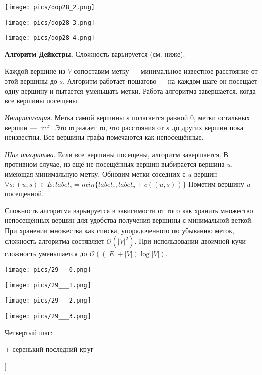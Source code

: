 \texttt{[image: pics/dop28\_2.png]}

\texttt{[image: pics/dop28\_3.png]}

\texttt{[image: pics/dop28\_4.png]}

\textbf{Алгоритм Дейкстры.}
Сложность варьируется (см. ниже).

Каждой вершине из $V$ сопоставим метку --- минимальное известное расстояние от этой вершины до $s$.
Алгоритм работает пошагово --- на каждом шаге он посещает одну вершину и пытается уменьшать метки.
Работа алгоритма завершается, когда все вершины посещены.

\textit{Инициализация}.
Метка самой вершины $s$ полагается равной 0, метки остальных вершин --- $\inf$.
Это отражает то, что расстояния от $s$ до других вершин пока неизвестны.
Все вершины графа помечаются как непосещённые.

\textit{Шаг алгоритма}.
Если все вершины посещены, алгоритм завершается.
В противном случае, из ещё не посещённых вершин выбирается вершина $u$, имеющая минимальную метку.
Обновим метки соседних с $u$ вершин - $\forall s: (u,s) \in E: label_s = min\{label_s, label_u + c((u, s))\}$
Пометим вершину $u$ посещенной.

Сложность алгоритма варьируется в зависимости от того как хранить множество непосещенных вершин для удобства получения вершины с минимальной веткой. При хранении множества как списка, упорядоченного по убыванию меток, сложность алгоритма состявляет $\mathcal{O}(|V|^2)$. При использовании двоичной кучи сложность уменьшается до $\mathcal{O}((|E| + |V|) \log|V|)$.


\texttt{[image: pics/29\_\_\_0.png]}

\texttt{[image: pics/29\_\_\_1.png]}

\texttt{[image: pics/29\_\_\_2.png]}

\texttt{[image: pics/29\_\_\_3.png]}

Четвертый шаг:

+ серенький последний круг

\bigbreak
[\cite[page 69-96]{replace_me}]
